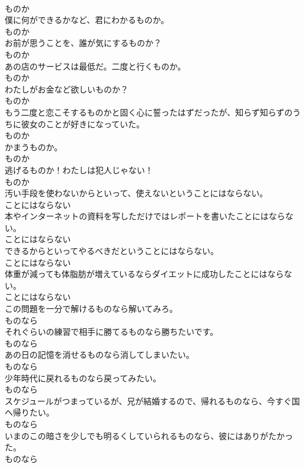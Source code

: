 \documentclass[8pt]{extreport}
\begin{document}
\begin{CJK}{UTF8}{min}
\\	ものか
\\	僕に何ができるかなど、君にわかるものか。	
\\	ものか
\\	お前が思うことを、誰が気にするものか？	
\\	ものか
\\	あの店のサービスは最低だ。二度と行くものか。	
\\	ものか
\\	わたしがお金など欲しいものか？	
\\	ものか
\\	もう二度と恋こそするものかと固く心に誓ったはずだったが、知らず知らずのうちに彼女のことが好きになっていた。	
\\	ものか
\\	かまうものか。	
\\	ものか
\\	逃げるものか！わたしは犯人じゃない！	
\\	ものか
\\	汚い手段を使わないからといって、使えないということにはならない。	
\\	ことにはならない
\\	本やインターネットの資料を写しただけではレポートを書いたことにはならない。	
\\	ことにはならない
\\	できるからといってやるべきだということにはならない。	
\\	ことにはならない
\\	体重が減っても体脂肪が増えているならダイエットに成功したことにはならない。	
\\	ことにはならない
\\	この問題を一分で解けるものなら解いてみろ。	
\\	ものなら
\\	それぐらいの練習で相手に勝てるものなら勝ちたいです。	
\\	ものなら
\\	あの日の記憶を消せるものなら消してしまいたい。	
\\	ものなら
\\	少年時代に戻れるものなら戻ってみたい。	
\\	ものなら
\\	スケジュールがつまっているが、兄が結婚するので、帰れるものなら、今すぐ国へ帰りたい。	
\\	ものなら
\\	いまのこの暗さを少しでも明るくしていられるものなら、彼にはありがたかった。	
\\	ものなら

\end{CJK}
\end{document}
